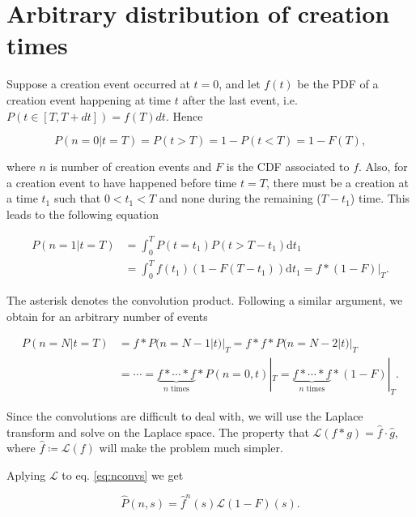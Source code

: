\section{Arbitrary distribution of creation times}

Suppose a creation event occurred at $t=0$, and let $f(t)$ be the PDF of a creation event happening at time $t$ after the last event, i.e. $P(t\in[T,T+dt])=f(T)dt$. Hence

\begin{equation*}
P(n=0|t=T) = P(t>T) = 1 - P(t<T) = 1 - F(T),
\end{equation*}

where $n$ is number of creation events and $F$ is the CDF associated to $f$. Also, for a creation event to have happened before time $t=T$, there must be a creation at a time $t_1$ such that $0<t_1<T$ and none during the remaining ($T-t_1$) time. This leads to the following equation

\begin{equation*}
  \begin{split}
    P(n=1|t=T) &= \int_0^TP(t=t_1)P(t>T-t_1)\mathrm{d}t_1 \\
    &= \int_0^Tf(t_1)(1-F(T-t_1))\mathrm{d}t_1=f\ast (1-F)|_T.
  \end{split}
\end{equation*}

The asterisk denotes the convolution product. Following a similar argument, we obtain for an arbitrary number of events

\begin{equation}
  \label{eq:nconvs}
  \begin{split}
    P(n=N|t=T) &= f\ast P(n=N-1|t)|_T = f\ast f\ast P(n=N-2|t)|_T \\
    &= \cdots = \underbrace{f\ast\cdots\ast f}_{n \text{ times}}\ast P(n=0,t)|_T = \underbrace{f\ast\cdots\ast f}_{n \text{ times}}\ast (1-F)|_T.
  \end{split}
\end{equation}

Since the convolutions are difficult to deal with, we will use the Laplace transform and solve on the Laplace space. The property that $\mathcal{L}(f\ast g) = \hat{f}\cdot\hat{g}$, where $\hat{f}\coloneqq\mathcal{L}(f)$ will make the problem much simpler.

Aplying $\mathcal{L}$ to eq. \eqref{eq:nconvs} we get

\begin{equation*}
  \hat{P}(n,s) = \hat{f}^n(s)\mathcal{L}(1-F)(s).
\end{equation*}

